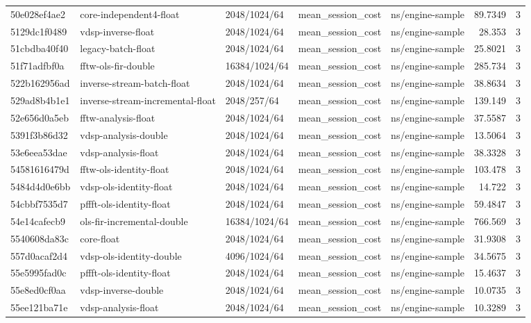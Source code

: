 \begin{longtable}{lllllrr}
50e028ef4ae2 & core-independent4-float & 2048/1024/64 & mean\_session\_cost & ns/engine-sample & 89.7349 & 3 \\
5129dc1f0489 & vdsp-inverse-float & 2048/1024/64 & mean\_session\_cost & ns/engine-sample & 28.353 & 3 \\
51cbdba40f40 & legacy-batch-float & 2048/1024/64 & mean\_session\_cost & ns/engine-sample & 25.8021 & 3 \\
51f71adfbf0a & fftw-ols-fir-double & 16384/1024/64 & mean\_session\_cost & ns/engine-sample & 285.734 & 3 \\
522b162956ad & inverse-stream-batch-float & 2048/1024/64 & mean\_session\_cost & ns/engine-sample & 38.8634 & 3 \\
529ad8b4b1e1 & inverse-stream-incremental-float & 2048/257/64 & mean\_session\_cost & ns/engine-sample & 139.149 & 3 \\
52e656d0a5eb & fftw-analysis-float & 2048/1024/64 & mean\_session\_cost & ns/engine-sample & 37.5587 & 3 \\
5391f3b86d32 & vdsp-analysis-double & 2048/1024/64 & mean\_session\_cost & ns/engine-sample & 13.5064 & 3 \\
53e6eea53dae & vdsp-analysis-float & 2048/1024/64 & mean\_session\_cost & ns/engine-sample & 38.3328 & 3 \\
54581616479d & fftw-ols-identity-float & 2048/1024/64 & mean\_session\_cost & ns/engine-sample & 103.478 & 3 \\
5484d4d0e6bb & vdsp-ols-identity-float & 2048/1024/64 & mean\_session\_cost & ns/engine-sample & 14.722 & 3 \\
54cbbf7535d7 & pffft-ols-identity-float & 2048/1024/64 & mean\_session\_cost & ns/engine-sample & 59.4847 & 3 \\
54e14cafecb9 & ols-fir-incremental-double & 16384/1024/64 & mean\_session\_cost & ns/engine-sample & 766.569 & 3 \\
5540608da83c & core-float & 2048/1024/64 & mean\_session\_cost & ns/engine-sample & 31.9308 & 3 \\
557d0acaf2d4 & vdsp-ols-identity-double & 4096/1024/64 & mean\_session\_cost & ns/engine-sample & 34.5675 & 3 \\
55e5995fad0c & pffft-ols-identity-float & 2048/1024/64 & mean\_session\_cost & ns/engine-sample & 15.4637 & 3 \\
55e8ed0cf0aa & vdsp-inverse-double & 2048/1024/64 & mean\_session\_cost & ns/engine-sample & 10.0735 & 3 \\
55ee121ba71e & vdsp-analysis-float & 2048/1024/64 & mean\_session\_cost & ns/engine-sample & 10.3289 & 3 \\

\end{longtable}
